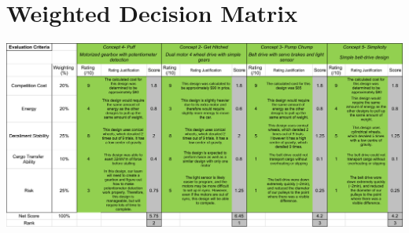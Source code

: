 \documentclass[class=../../report, crop=false]{standalone}
\begin{document}
\section{Weighted Decision Matrix} \label{app:wdm}
\mbox{} \begin{center}
	\begin{sideways}
		\begin{minipage}{1.1\textwidth}
			\includegraphics[width=\textwidth]{../../res/img/wdmregular}
			\label{app/table:wdm}
		\end{minipage}
	\end{sideways}
\end{center}
\end{document}
